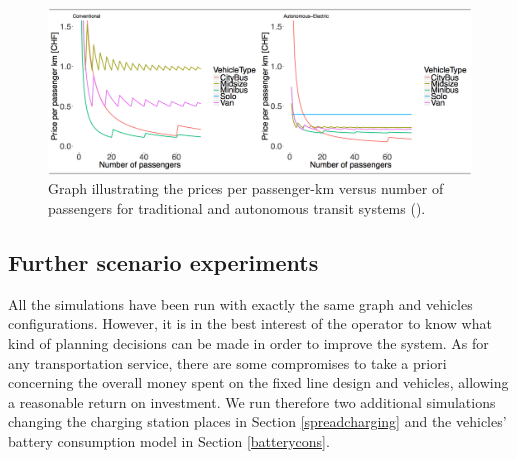 \documentclass[12pt,a4paper]{article}
\begin{document}
 \begin{figure}[h] 
  \centering
\includegraphics[scale=0.5]{./images/passengerperkmcost}
  \caption{Graph illustrating the prices per passenger-km versus number of passengers for traditional and autonomous transit systems (\cite{ethz}).}
\label{passengerkm}
\end{figure}

\subsection{Further scenario experiments}\label{further}
All the simulations have been run with exactly the same graph and vehicles configurations. However, it is in the best interest of the operator to know what kind of planning decisions can be made in order to improve the system. As for any transportation service, there are some compromises to take a priori concerning the overall money spent on the fixed line design and vehicles, allowing a reasonable return on investment. We run therefore two additional simulations changing the charging station places in Section \ref{spreadcharging} and the vehicles' battery consumption model in Section \ref{batterycons}.
\end{document}
